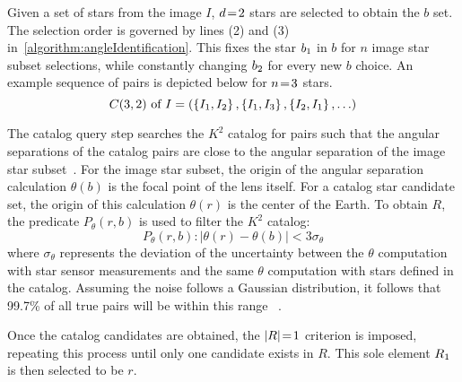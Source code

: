 Given a set of stars from the image $I$, $d \!=\! 2$ stars are selected to obtain the $b$ set.
The selection order is governed by lines (2) and (3) in~\autoref{algorithm:angleIdentification}.
This fixes the star $b_1$ in $b$ for $n$ image star subset selections, while constantly changing
$b_2$ for every new $b$ choice.
An example sequence of pairs is depicted below for $n \!=\! 3$ stars.
\begin{equation}
    C(3, 2) \text{ of } I = \left(\left\{ I_1, I_2 \right\}, \left\{ I_1,I_3 \right\}, \left\{ I_2,I_1 \right\},
    \ldots \right)
\end{equation}

The catalog query step searches the $K^2$ catalog for pairs such that the angular separations of the catalog pairs
are close to the angular separation of the image star subset~\cite{bratt:analysisStarIdentification}.
For the image star subset, the origin of the angular separation calculation $\theta(b)$ is the focal point of the lens
itself.
For a catalog star candidate set, the origin of this calculation $\theta(r)$ is the center of the Earth.
To obtain $R$, the predicate $P_\theta(r, b)$ is used to filter the $K^2$ catalog:
\begin{equation}\label{eq:angleRequirement}
    P_{\theta}(r, b) : \left\lvert \theta(r) - \theta(b)\right\rvert < 3 \sigma_\theta
\end{equation}
where $\sigma_{\theta}$ represents the deviation of the uncertainty between the $\theta$ computation with star
sensor measurements and the same $\theta$ computation with stars defined in the catalog.
Assuming the noise follows a Gaussian distribution, it follows that 99.7\% of all true pairs will be within this range
~\cite{coleAndCrassidis:sphericalTriangleMethod}.

Once the catalog candidates are obtained, the $\left| R \right| \!=\! 1$ criterion is imposed, repeating this process until only
one candidate exists in $R$.
This sole element $R_1$ is then selected to be $r$.

